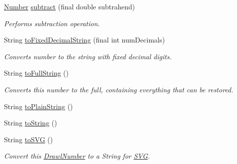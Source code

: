 \begin{DoxyCompactItemize}
\hyperlink{interfacecom_1_1aarrelaakso_1_1drawl_1_1_number}{Number} \hyperlink{classcom_1_1aarrelaakso_1_1drawl_1_1_drawl_number_ade985c4a55ea33886939801ceacd254c}{subtract} (final double subtrahend)
\begin{DoxyCompactList}\small\item\em Performs subtraction operation. \end{DoxyCompactList}\item 
String \hyperlink{classcom_1_1aarrelaakso_1_1drawl_1_1_drawl_number_a5fe84caaf56b210850be966218f70ca9}{to\+Fixed\+Decimal\+String} (final int num\+Decimals)
\begin{DoxyCompactList}\small\item\em Converts number to the string with fixed decimal digits. \end{DoxyCompactList}\item 
String \hyperlink{classcom_1_1aarrelaakso_1_1drawl_1_1_drawl_number_afa8d185aa5f961e7d54e62c96d788660}{to\+Full\+String} ()
\begin{DoxyCompactList}\small\item\em Converts this number to the full, containing everything that can be restored. \end{DoxyCompactList}\item 
String \hyperlink{classcom_1_1aarrelaakso_1_1drawl_1_1_drawl_number_a07c4c1c3a0e81ae9aef3325bef3e0152}{to\+Plain\+String} ()
\item 
String \hyperlink{classcom_1_1aarrelaakso_1_1drawl_1_1_drawl_number_a24775bf5217d477c4b39149596210184}{to\+String} ()
\item 
String \hyperlink{classcom_1_1aarrelaakso_1_1drawl_1_1_drawl_number_a63169b633e2d9807b56379238f5acaa0}{to\+S\+VG} ()
\begin{DoxyCompactList}\small\item\em Convert this \hyperlink{classcom_1_1aarrelaakso_1_1drawl_1_1_drawl_number}{Drawl\+Number} to a String for \hyperlink{classcom_1_1aarrelaakso_1_1drawl_1_1_s_v_g}{S\+VG}. \end{DoxyCompactList}\end{DoxyCompactItemize}
